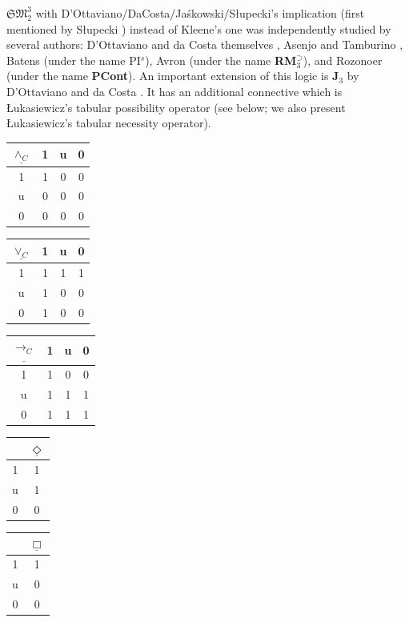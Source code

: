 \documentclass[10pt,a4paper]{article}
\theoremstyle{definition}
\newcommand{\3}{\vspace{.3in}}
\newcommand{\2}{\vspace{.2in}}
\newcommand{\1}{\vspace{.1in}}
\newcommand{\5}{\vspace{.05in}}
\begin{document}
$\mathfrak{SM}_2^3$ with D'Ottaviano/DaCosta/Ja\'{s}kowski/S\l{}upecki's implication (first mentioned by S\l{}upecki \cite{Slupecki39}) instead of Kleene's one was independently studied by several authors: D'Ottaviano and da Costa themselves \cite{DOttavianodaCosta,daCosta}, Asenjo and Tamburino \cite{AsenjoTamburino}, Batens \cite{Batens} (under the name PI$^s$), Avron \cite{Avron86} (under the name {\bf RM$_3^\supset$}), and Rozonoer \cite{Rozonoer} (under the name \textbf{PCont}). An important extension of this logic is {\bf J$_3$} by D'Ottaviano and da Costa \cite{DOttavianodaCosta}. It has an additional connective which is \L ukasiewicz's tabular possibility operator (see below; we also present \L ukasiewicz's tabular necessity operator). 

\begin{center}
	\begin{tabular}{|c|ccc|}
		\hline
		$\underline{\wedge_C} $ & 1 & u & 0 \\
		\hline
		1 & 1 & 0 & 0 \\
		u & 0 & 0 & 0 \\
		0 & 0 & 0 & 0 \\
		\hline
	\end{tabular}
	\begin{tabular}{|c|ccc|}
		\hline$\underline{\vee_C} $ & 1 & u & 0 \\\hline
		1 & 1 & 1 & 1 \\
		u & 1 & 0 & 0 \\
		0 & 1 & 0 & 0 \\\hline
	\end{tabular}
	\begin{tabular}{|c|ccc|}
		\hline
		$\underline{\rightarrow_C} $ & 1 & u & 0 \\
		\hline
		1 & 1 & 0 & 0 \\
		u & 1 & 1 & 1 \\
		0 & 1 & 1 & 1 \\
		\hline
	\end{tabular}
\begin{tabular}{|c|c|}
	\hline & $\underline{\Diamond}$\\\hline
	1 & 1\\
	u & 1\\
	0 & 0\\\hline
\end{tabular}
\begin{tabular}{|c|c|}
	\hline & $\underline{\Box}$\\\hline
	1 & 1\\
	u & 0\\
	0 & 0\\\hline
\end{tabular}	
\end{center}
\end{document}
